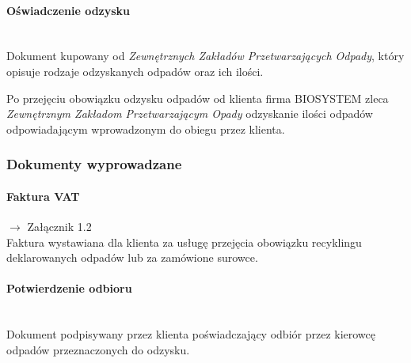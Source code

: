 	\paragraph{Oświadczenie odzysku} \ \\
	Dokument kupowany od \emph{Zewnętrznych Zakładów Przetwarzających Odpady}, który opisuje rodzaje odzyskanych odpadów oraz ich ilości.

	Po przejęciu obowiązku odzysku odpadów od klienta firma BIOSYSTEM zleca \emph{Zewnętrznym Zakładom Przetwarzającym Opady} odzyskanie ilości odpadów odpowiadającym wprowadzonym do obiegu przez klienta.

\subsubsection{Dokumenty wyprowadzane}
	\paragraph{Faktura VAT} $\rightarrow$ Załącznik 1.2 \\
	Faktura wystawiana dla klienta za usługę przejęcia obowiązku recyklingu deklarowanych odpadów lub za zamówione surowce.

	\paragraph{Potwierdzenie odbioru} \ \\
	Dokument podpisywany przez klienta poświadczający odbiór przez kierowcę odpadów przeznaczonych do odzysku.
